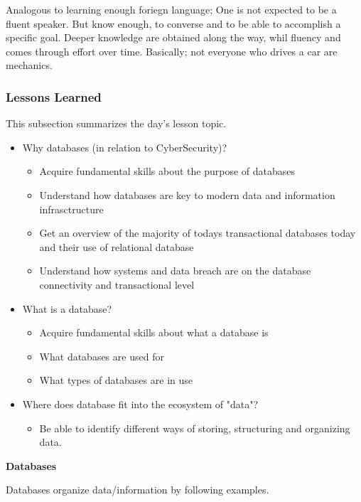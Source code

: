 {Analogous to learning enough foriegn language; One is not expected to be a fluent speaker. But know enough, to converse and to be able to accomplish a specific goal. Deeper knowledge are obtained along the way, whil fluency and comes through effort over time. Basically; not everyone who drives a car are mechanics.

\subsubsection{Lessons Learned}

This subsection summarizes the day's lesson topic.


\begin{itemize}
    \item Why databases (in relation to CyberSecurity)?
        \begin{itemize}
            \item Acquire fundamental skills about the purpose of databases
            \item Understand how databases are key to modern data and information infrasctructure
            \item Get an overview of the majority of todays transactional databases today and their use of relational database
            \item Understand how systems and data breach are on the database connectivity and transactional level
        \end{itemize}
    \item What is a database?
        \begin{itemize}
            \item Acquire fundamental skills about what a database is
            \item What databases are used for
            \item What types of databases are in use
        \end{itemize}
    \item Where does database fit into the ecosystem of "data"?
        \begin{itemize}
            \item Be able to identify different ways of storing, structuring and organizing data.
        \end{itemize}
\end{itemize}


{\bfseries{Databases}}



Databases organize data/information by following examples.


}
